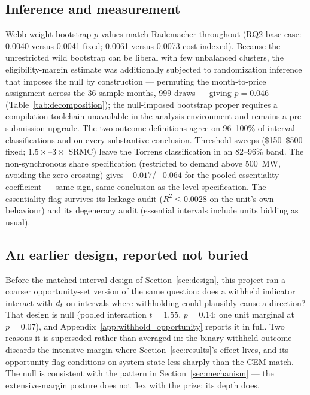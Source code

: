 \subsection{Inference and measurement}

Webb-weight bootstrap $p$-values match Rademacher throughout (RQ2 base case:
0.0040 versus 0.0041 fixed; 0.0061 versus 0.0073 cost-indexed). Because the
unrestricted wild bootstrap can be liberal with few unbalanced clusters,
the eligibility-margin estimate was additionally subjected to randomization
inference that imposes the null by construction --- permuting the
month-to-price assignment across the 36 sample months, 999 draws --- giving
$p=0.046$ (Table~\ref{tab:decomposition}); the null-imposed bootstrap
proper requires a compilation toolchain unavailable in the analysis
environment and remains a pre-submission upgrade. The two
outcome definitions agree on 96--100\% of interval classifications and on
every substantive conclusion. Threshold sweeps (\$150--\$500 fixed;
$1.5\times$--$3\times$ SRMC) leave the Torrens classification in an 82--96\%
band. The non-synchronous share specification (restricted to demand above
500~MW, avoiding the zero-crossing) gives $-0.017$/$-0.064$ for the pooled
essentiality coefficient --- same sign, same conclusion as the level
specification. The essentiality flag survives its leakage audit
($R^{2}\leq 0.0028$ on the unit's own behaviour) and its degeneracy audit
(essential intervals include units bidding as usual).

\subsection{An earlier design, reported not buried}

Before the matched interval design of Section~\ref{sec:design}, this project
ran a coarser opportunity-set version of the same question: does a withheld
indicator interact with $d_t$ on intervals where withholding could plausibly
cause a direction? That design is null (pooled interaction $t=1.55$,
$p=0.14$; one unit marginal at $p=0.07$), and Appendix~\ref{app:withhold_opportunity}
reports it in full. Two reasons it is superseded rather than averaged in: the
binary withheld outcome discards the intensive margin where
Section~\ref{sec:results}'s effect lives, and its opportunity flag conditions
on system state less sharply than the CEM match. The null is consistent with
the pattern in Section~\ref{sec:mechanism} --- the extensive-margin posture
does not flex with the prize; its depth does.
